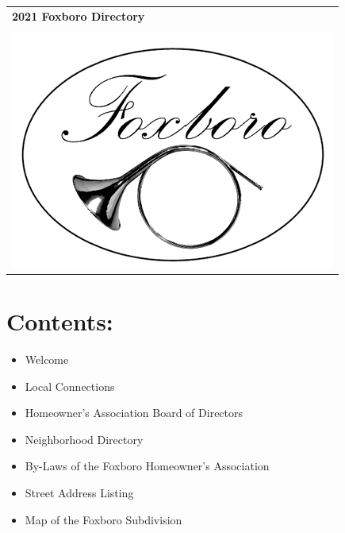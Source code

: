 \documentclass[10pt]{report}
\begin{document}
\setcounter{secnumdepth}{0}

\begin{center}
\begin{tabular}{ p{} }
	{\Huge {\bf 2021 Foxboro Directory}} \\
	\\
	\midrule
	\includegraphics[]{foxboro_logo.png} \\
	\midrule
\end{tabular}
\end{center}


\section{Contents:}
\begin{itemize}
	\item Welcome
	\item Local Connections
	\item Homeowner’s Association Board of Directors
	\item Neighborhood Directory
	\item By-Laws of the Foxboro Homeowner’s Association
	\item Street Address Listing
	\item Map of the Foxboro Subdivision
\end{itemize}
\newpage



\newpage


\newpage


\newpage


\newpage
\end{document}
